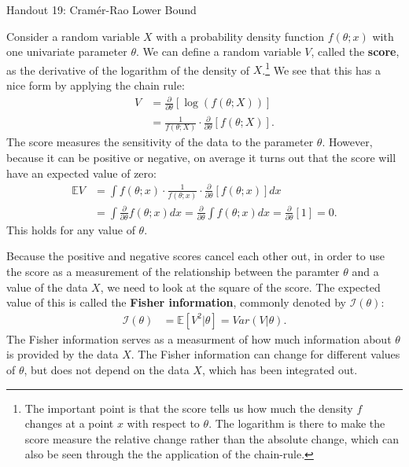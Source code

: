 \documentclass{tufte-handout}
\begin{document}
\justify

{\LARGE Handout 19: Cramér-Rao Lower Bound}

\vspace*{18pt}

\noindent
Consider a random variable $X$ with a probability density function 
$f(\theta; x)$ with one univariate parameter $\theta$. We
can define a random variable $V$, called the \textbf{score},
as the derivative of the logarithm of the density of $X$.\footnote{
  The important point is that the score tells us how much the density
  $f$ changes at a point $x$ with respect to $\theta$. The logarithm
  is there to make the score measure the relative change rather than
  the absolute change, which can also be seen through the the application
  of the chain-rule.
}
We see that this has a nice form by applying the chain rule:
\begin{align*}
V &= \frac{\partial}{\partial \theta} \left[ \log(f(\theta; X)) \right] \\
&= \frac{1}{f(\theta; X)} \cdot \frac{\partial}{\partial \theta} \left[ f(\theta; X) \right].
\end{align*}
The score measures the sensitivity of the data to the parameter $\theta$.
However, because it can be positive or negative, on average it turns out
that the score will have an expected value of zero:
\begin{align*}
\mathbb{E} V &= \int f(\theta; x) \cdot \frac{1}{f(\theta; x)} \cdot \frac{\partial}{\partial \theta} \left[ f(\theta; x) \right] dx \\
&= \int \frac{\partial}{\partial \theta} f(\theta; x) dx =
\frac{\partial}{\partial \theta} \int f(\theta; x) dx = \frac{\partial}{\partial \theta} \left[1\right] = 0.
\end{align*}
This holds for any value of $\theta$. 

Because the positive and negative scores cancel each other out,
in order to use the score as a measurement of the relationship
between the paramter $\theta$ and a value of the data $X$, we
need to look at the square of the score. The expected value of
this is called the \textbf{Fisher information}, commonly denoted
by $\mathcal{I}(\theta)$:
\begin{align*}
\mathcal{I}(\theta) &= \mathbb{E}[V^2|\theta] = Var(V | \theta).
\end{align*}
The Fisher information serves as a measurment of how much information
about $\theta$ is provided by the data $X$. The Fisher information can
change for different values of $\theta$, but does not depend on the
data $X$, which has been integrated out.
\end{document}
